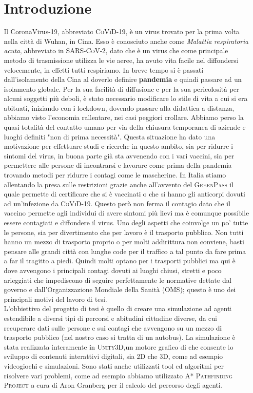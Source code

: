 \documentclass[12pt, openany]{book}
\begin{document}
	\chapter*{Introduzione}	
		Il CoronaVirus-19, abbreviato \textsc{CoViD-19}, è un virus trovato per la prima volta nella città di Wuhan, in Cina. Esso è conosciuto anche come \emph{Malattia respiratoria acuta}, abbreviato in \textsc{SARS-CoV-2}, dato che è un virus che come principale metodo di trasmissione utilizza le vie aeree, ha avuto vita facile nel diffondersi velocemente, in effetti tutti respiriamo. In breve tempo si è passati dall'isolamento della Cina al doverlo definire \textbf{pandemia} e quindi passare ad un isolamento globale.
		Per la sua facilità di diffusione e per la sua pericolosità per alcuni soggetti più deboli, è stato necessario modificare lo stile di vita a cui si era abituati, iniziando con i lockdown, dovendo passare alla didattica a distanza, abbiamo visto l'economia rallentare, nei casi peggiori crollare. Abbiamo perso la quasi totalità del contatto umano per via  della chiusura temporanea di aziende e luoghi definiti "non di prima necessità".
		Questa situazione ha dato una motivazione per effettuare studi e ricerche in questo ambito, sia per ridurre i sintomi del virus, in buona parte già sta avvenendo con i vari vaccini, sia per permettere alle persone di incontrarsi e lavorare come prima della pandemia trovando metodi per ridurre i contagi come le mascherine. In Italia stiamo allentando la presa sulle restrizioni grazie anche all'avvento del \textsc{GreenPass} il quale permette di certificare che si è vaccinati o che si hanno gli anticorpi dovuti ad un'infezione da \textsc{CoViD-19}. Questo però non ferma il contagio dato che il vaccino permette agli individui di avere sintomi più lievi ma è comunque possibile essere contagiati e diffondere il virus. 
		Uno degli aspetti che coinvolge un po' tutte le persone, sia per divertimento che per lavoro è il trasporto pubblico. Non tutti hanno un mezzo di trasporto proprio o per molti addirittura non conviene, basti pensare alle grandi città con lunghe code per il traffico a tal punto da fare prima a far il tragitto a piedi. Quindi molti optano per i trasporti pubblici ma qui è dove avvengono i principali contagi dovuti ai luoghi chiusi, stretti e poco arieggiati che impediscono di seguire perfettamente le normative dettate dal governo e dall'Organizzazione Mondiale della Sanità (OMS); questo è uno dei principali motivi del lavoro di tesi.\\
		L'obbiettivo del progetto di tesi è quello di creare una simulazione ad agenti estendibile a diversi tipi di percorsi e abitudini cittadine diverse, da cui recuperare dati sulle persone e sui contagi che avvengono su un mezzo di trasporto pubblico (nel nostro caso si tratta di un autobus). La simulazione è stata realizzata interamente in \textsc{Unity3D},un motore grafico di che consente lo sviluppo di contenuti interattivi digitali, sia 2D che 3D, come ad esempio videogiochi e simulazioni. Sono stati anche utilizzati tool ed algoritmi per risolvere  vari problemi, come ad esempio abbiamo utilizzato \textsc{A* Pathfinding Project} a cura di Aron Granberg per il calcolo del percorso degli agenti. 
\end{document}
